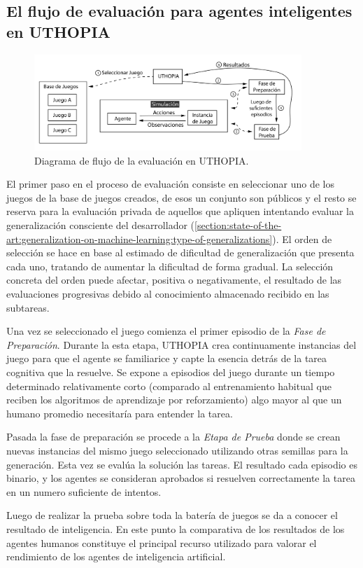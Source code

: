 \subsection{El flujo de evaluación para agentes inteligentes en UTHOPIA}

\begin{figure}[ht!]
    \centering
    \includegraphics[width=0.9\textwidth]{Graphics/uthopia_flow.png}
    \caption{Diagrama de flujo de la evaluación en UTHOPIA.}
    \label{fig:uthopia_flow}
\end{figure}

El primer paso en el proceso de evaluación consiste en seleccionar uno de los juegos de la base de juegos creados, de esos un conjunto son públicos y el resto se reserva para la evaluación privada de aquellos que apliquen intentando evaluar la generalización consciente del desarrollador (\ref{section:state-of-the-art:generalization-on-machine-learning:type-of-generalizations}). El orden de selección se hace en base al estimado de dificultad de generalización que presenta cada uno, tratando de aumentar la dificultad de forma gradual. La selección concreta del orden puede afectar, positiva o negativamente, el resultado de las evaluaciones progresivas debido al conocimiento almacenado recibido en las subtareas.

Una vez se seleccionado el juego comienza el primer episodio de la \textit{Fase de Preparación}. Durante la esta etapa, UTHOPIA crea continuamente instancias del juego para que el agente se familiarice y capte la esencia detrás de la tarea cognitiva que la resuelve. Se expone a episodios del juego durante un tiempo determinado relativamente corto (comparado al entrenamiento habitual que reciben los algoritmos de aprendizaje por reforzamiento) algo mayor al que un humano promedio necesitaría para entender la tarea.

Pasada la fase de preparación se procede a la \textit{Etapa de Prueba} donde se crean nuevas instancias del mismo juego seleccionado utilizando otras semillas para la generación. Esta vez se evalúa la solución las tareas. El resultado cada episodio es binario, y los agentes se consideran aprobados si resuelven correctamente la tarea en un numero suficiente de intentos.

Luego de realizar la prueba sobre toda la batería de juegos se da a conocer el resultado de inteligencia. En este punto la comparativa de los resultados de los agentes humanos constituye el principal recurso utilizado para valorar el rendimiento de los agentes de inteligencia artificial.

